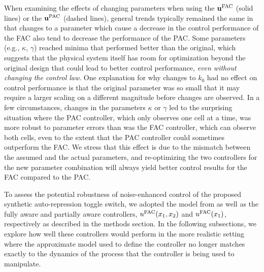 \documentclass[12pt]{article}
\begin{document}
When examining the effects of changing parameters when using the $\mathbf{u}^{\rm FAC}$ (solid lines) or the $\mathbf{u}^{\rm PAC}$ (dashed lines), general trends typically remained the same in that changes to a parameter which cause a decrease in the control performance of the FAC also tend to decrease the performance of the PAC. Some parameters (e.g., $\kappa$, $\gamma$) reached minima that performed better than the original, which suggests that the physical system itself has room for optimization beyond the original design that could lead to better control performance, {\em even without changing the control law}.  One explanation for why changes to $k_0$ had no effect on control performance is that the original parameter was so small that it may require a larger scaling on a different magnitude before changes are observed. 
In a few circumstances, changes in the parameters $\kappa$ or $\gamma$ led to the surprising situation where the PAC controller, which only observes one cell at a time, was more robust to parameter errors than was the FAC controller, which can observe both cells, even to the extent that the PAC controller could sometimes outperform the FAC.  We stress that this effect is due to the mismatch between the assumed and the actual parameters, and re-optimizing the two controllers for the new parameter combination will always yield better control results for the FAC compared to the PAC.


To assess the potential robustness of noise-enhanced control of the proposed synthetic auto-repression toggle switch, we adopted the model  from \cite{May2021} as well as the fully aware and partially aware controllers, $u^{\rm FAC}(x_1,x_2)$ and  $u^{\rm FAC}(x_1)$, respectively as described in the methods section.  In the following subsections, we explore how well these controllers would perform in the more realistic setting where the approximate model used to define the controller no longer matches exactly to the dynamics of the process that the controller is being used to manipulate. 
\end{document}
